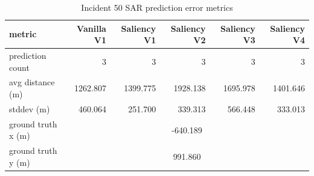 \begin{table}[ht]
\centering
\caption{Incident 50 SAR prediction error metrics}
\label{tab:sar-incident-50}
\begin{tabular}{lrrrrr}
\hline
metric & Vanilla V1 & Saliency V1 & Saliency V2 & Saliency V3 & Saliency V4 \\
\hline
prediction count & 3 & 3 & 3 & 3 & 3 \\
avg distance (m) & 1262.807 & 1399.775 & 1928.138 & 1695.978 & 1401.646 \\
stddev (m) & 460.064 & 251.700 & 339.313 & 566.448 & 333.013 \\
ground truth x (m) & \multicolumn{5}{c}{-640.189} \\
ground truth y (m) & \multicolumn{5}{c}{991.860} \\
\hline
\end{tabular}
\end{table}
